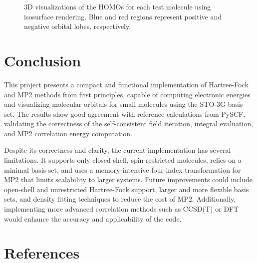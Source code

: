 \documentclass[12pt]{article}
\begin{document}
\begin{figure}[H]
    \caption{3D visualizations of the HOMOs for each test molecule using isosurface rendering. Blue and red regions represent positive and negative orbital lobes, respectively.}
\end{figure}

\section{Conclusion}

This project presents a compact and functional implementation of Hartree-Fock and MP2 methods from first principles, capable of computing electronic energies and visualizing molecular orbitals for small molecules using the STO-3G basis set. The results show good agreement with reference calculations from PySCF, validating the correctness of the self-consistent field iteration, integral evaluation, and MP2 correlation energy computation.

Despite its correctness and clarity, the current implementation has several limitations. It supports only closed-shell, spin-restricted molecules, relies on a minimal basis set, and uses a memory-intensive four-index transformation for MP2 that limits scalability to larger systems. Future improvements could include open-shell and unrestricted Hartree-Fock support, larger and more flexible basis sets, and density fitting techniques to reduce the cost of MP2. Additionally, implementing more advanced correlation methods such as CCSD(T) or DFT would enhance the accuracy and applicability of the code. 

\section*{References}
\end{document}
